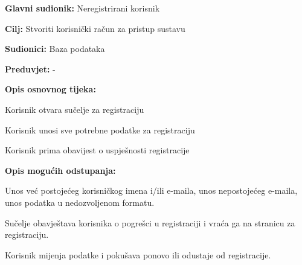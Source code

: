 					\noindent {}
					\begin{packed_item}
	
						\item \textbf{Glavni sudionik: } Neregistrirani korisnik
						\item  \textbf{Cilj: } Stvoriti korisnički račun za pristup sustavu
						\item  \textbf{Sudionici: } Baza podataka
						\item  \textbf{Preduvjet: } -
						\item  \textbf{Opis osnovnog tijeka:}
						
						\item[] \begin{packed_enum}
	
							\item Korisnik otvara sučelje za registraciju
							\item Korisnik unosi sve potrebne podatke za registraciju
							\item Korisnik prima obavijest o uspješnosti registracije
							
						\end{packed_enum}
						
						\item  \textbf{Opis mogućih odstupanja:}
						
						\item[] \begin{packed_item}
	
							\item[2.a] Unos već postojećeg korisničkog imena i/ili e-maila, unos nepostojećeg e-maila, unos podatka u nedozvoljenom formatu.
							\item[] \begin{packed_enum}
								
								\item Sučelje obavještava korisnika o pogrešci u registraciji i vraća ga na stranicu za registraciju.
								\item Korisnik mijenja podatke i pokušava ponovo ili odustaje od registracije.
								
							\end{packed_enum}
							
						\end{packed_item}
					\end{packed_item}
					

